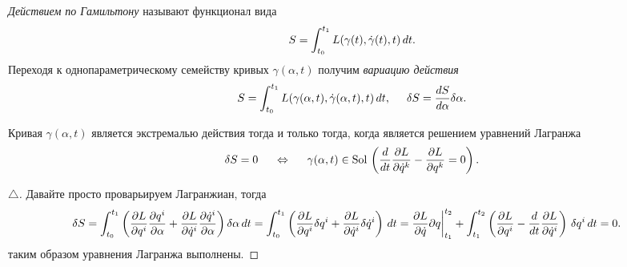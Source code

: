 \begin{to_def} 
    \textit{Действием по Гамильтону} называют функционал вида
    \begin{equation*}
         S = \int_{t_0}^{t_1} L(\gamma(t), \dot{\gamma}(t), t) \, d t.
    \end{equation*} 
    Переходя к однопараметрическому семейству кривых $\gamma(\alpha, t)$ получим \textit{вариацию действия}
    \begin{equation*}
        S = \int_{t_0}^{t_1} L(\gamma(\alpha, t), \dot{\gamma}(\alpha, t), t) \, d t, 
        \hspace{0.5cm} 
        \delta S = \frac{d S}{d \alpha} \delta \alpha.
    \end{equation*}
\end{to_def}


\begin{to_thr}
    Кривая $\gamma(\alpha, t)$ является экстремалью действия тогда и только тогда, когда является решением уравнений Лагранжа
     \begin{equation*}
         \delta S = 0
         \hspace{0.5cm} \Leftrightarrow \hspace{0.5cm} 
         \gamma(\alpha, t) \in \textnormal{Sol}\,
         \left(
     \frac{d}{dt} \frac{\partial L}{\partial \dot{q}^k} - \frac{\partial L}{\partial q^k} = 0
         \right)
         .
     \end{equation*}
\end{to_thr}


\begin{proof}[$\triangle$]
    Давайте просто проварьируем Лагранжиан, тогда
    \begin{align*}
        \delta S 
        &=
         \int_{t_0}^{t_1} 
        \left(
            \frac{\partial L}{\partial q^i} \frac{\partial q^i}{\partial \alpha} +
            \frac{\partial L}{\partial \dot{q}^i} \frac{\partial \dot{q}^i}{\partial \alpha}  
        \right) \delta \alpha \, d t 
        =
        \int_{t_0}^{t_1} \left(
            \frac{\partial L}{\partial q^i} \delta q^i + \frac{\partial L}{\partial \dot{q}^i} \delta \dot{q}^i
        \right) \, d t
        =
        \frac{\partial L}{\partial \dot{q}} \partial q \bigg|_{t_1}^{t_2}
        + \int_{t_1}^{t_2}
        \left(
            \frac{\partial L}{\partial q^i} - \frac{d }{d t} \frac{\partial L}{\partial \dot{q}^i} 
        \right) \,\delta q^i \, d t
        = 0.
    \end{align*}
    таким образом уравнения Лагранжа выполнены. 
\end{proof}

